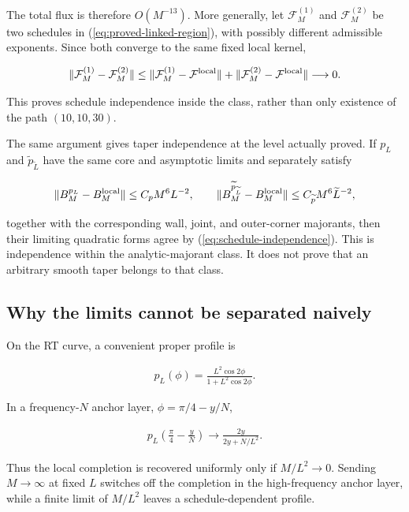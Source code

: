 The total flux is therefore $O(M^{-13})$. More generally, let $\mathcal F_M^{(1)}$ and $\mathcal F_M^{(2)}$ be two schedules in (\ref{eq:proved-linked-region}), with possibly different admissible exponents. Since both converge to the same fixed local kernel,

\begin{align}
\|\mathcal F_M^{(1)}-\mathcal F_M^{(2)}\|
\leq
\|\mathcal F_M^{(1)}-\mathcal F^{\rm local}\|
+\|\mathcal F_M^{(2)}-\mathcal F^{\rm local}\|
\longrightarrow0. \label{eq:schedule-independence}
\end{align}

This proves schedule independence inside the class, rather than only existence of the path $(10,10,30)$.

The same argument gives taper independence at the level actually proved. If $p_L$ and $\widetilde p_{\widetilde L}$ have the same core and asymptotic limits and separately satisfy

\begin{align}
\|B^{p_L}_{M}-B_M^{\rm local}\|
\leq C_pM^6L^{-2},
\qquad
\|B^{\widetilde p_{\widetilde L}}_{M}-B_M^{\rm local}\|
\leq C_{\widetilde p}M^6\widetilde L^{-2},
\end{align}

together with the corresponding wall, joint, and outer-corner majorants, then their limiting quadratic forms agree by (\ref{eq:schedule-independence}). This is independence within the analytic-majorant class. It does not prove that an arbitrary smooth taper belongs to that class.

\subsection{Why the limits cannot be separated naively}

On the RT curve, a convenient proper profile is

\begin{align}
p_L(\phi)
=\frac{L^2\cos2\phi}{1+L^2\cos2\phi}.
\end{align}

In a frequency-$N$ anchor layer, $\phi=\pi/4-y/N$,

\begin{align}
p_L\left(\frac\pi4-\frac yN\right)
\longrightarrow
\frac{2y}{2y+N/L^2}.
\end{align}

Thus the local completion is recovered uniformly only if $M/L^2\to0$. Sending $M\to\infty$ at fixed $L$ switches off the completion in the high-frequency anchor layer, while a finite limit of $M/L^2$ leaves a schedule-dependent profile.

